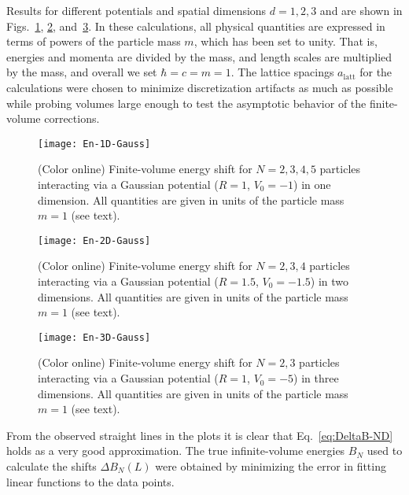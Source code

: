 \documentclass[aps,singlecolumn,superscriptaddress,nofootinbib,tightenlines,
preprintnumbers,showkeys]{revtex4-1}
\newcommand{\alatt}{\ensuremath{a_{\text{latt}}}}
\begin{document}
Results for different potentials and spatial dimensions $d=1,2,3$ and are 
shown in Figs.~\ref{fig:En-1D-Gauss}, \ref{fig:En-2D-Gauss}, 
and~\ref{fig:En-3D-Gauss}.  In these calculations, all physical quantities are 
expressed in terms of powers of the particle mass $m$, which has been set to 
unity.  That is, energies and momenta are divided by the mass, and length scales 
are multiplied by the mass, and overall we set $\hbar=c=m=1$.  The lattice 
spacings $\alatt$ for the calculations were chosen to minimize discretization 
artifacts as much as possible while probing volumes large enough to test the 
asymptotic behavior of the finite-volume corrections.
%
\begin{figure}[htb]
\centering
\texttt{[image: En-1D-Gauss]}
\caption{(Color online) Finite-volume energy shift for $N=2,3,4,5$ particles 
interacting via a Gaussian potential ($R=1$, $V_0=-1$) in one dimension.  All 
quantities are given in units of the particle mass $m=1$ (see text).}
\label{fig:En-1D-Gauss}
\end{figure}
\begin{figure}[htb]
\centering
\texttt{[image: En-2D-Gauss]}
\caption{(Color online) Finite-volume energy shift for $N=2,3,4$ particles 
interacting via a Gaussian potential ($R=1.5$, $V_0=-1.5$) in two dimensions.  
All quantities are given in units of the particle mass $m=1$ (see text).}
\label{fig:En-2D-Gauss}
\end{figure}
\begin{figure}[htb]
\centering
\texttt{[image: En-3D-Gauss]}
\caption{(Color online) Finite-volume energy shift for $N=2,3$ particles 
interacting via a Gaussian potential ($R=1$, $V_0=-5$) in three dimensions.
All quantities are given in units of the particle mass $m=1$ (see text).}
\label{fig:En-3D-Gauss}
\end{figure}
%
From the observed straight lines in the plots it is clear that 
Eq.~\eqref{eq:DeltaB-ND} holds as a very good approximation.  The true 
infinite-volume energies $B_N$ used to calculate the shifts $\Delta B_N(L)$ were 
obtained by minimizing the error in fitting linear functions to the data points.
\end{document}
